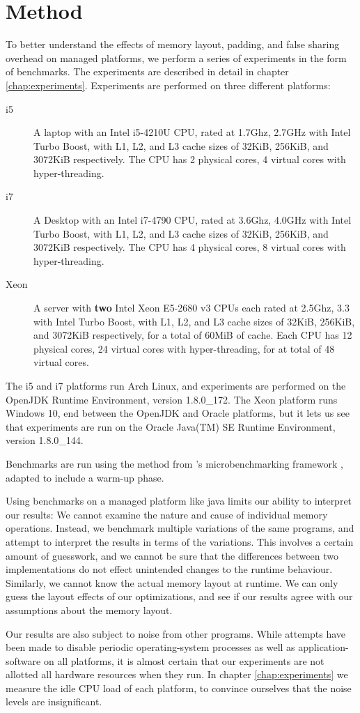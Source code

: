 \chapter{Method}
To better understand the effects of memory layout, padding, and false sharing
overhead on managed platforms, we perform a series of experiments in the form of
benchmarks. The experiments are described in detail in chapter
\ref{chap:experiments}. Experiments are performed on three different platforms:

\begin{description}
\item [i5] A laptop with an Intel i5-4210U CPU, rated at 1.7Ghz, 2.7GHz with Intel
Turbo Boost, with L1, L2, and L3 cache sizes of 32KiB, 256KiB, and 3072KiB
respectively. The CPU has 2 physical cores, 4 virtual cores with
hyper-threading.
\item [i7] A Desktop with an Intel i7-4790 CPU, rated at 3.6Ghz, 4.0GHz with Intel
Turbo Boost, with L1, L2, and L3 cache sizes of 32KiB, 256KiB, and 3072KiB
respectively. The CPU has 4 physical cores, 8 virtual cores with
hyper-threading.
\item [Xeon] A server with \textbf{two} Intel Xeon E5-2680 v3 CPUs each rated at
2.5Ghz, 3.3 with Intel Turbo Boost, with L1, L2, and L3 cache sizes of 32KiB,
256KiB, and 3072KiB respectively, for a total of 60MiB of cache. Each CPU has 12
physical cores, 24 virtual cores with hyper-threading, for at total of 48 virtual cores.
\end{description}

The i5 and i7 platforms run Arch Linux, and experiments are performed on the OpenJDK
Runtime Environment, version 1.8.0\_172. The Xeon platform runs Windows 10, end
between the OpenJDK and Oracle platforms, but it lets us see that 
experiments are run on the Oracle Java(TM) SE Runtime Environment, version
1.8.0\_144.

Benchmarks are run using the  method from \citeauthor{microbmarks}'s
microbenchmarking framework \cite{microbmarks}, adapted to include a warm-up
phase.

Using benchmarks on a managed platform like java limits our ability to interpret
our results: We cannot examine the nature and cause of individual memory
operations. Instead, we benchmark multiple variations of the same programs, and
attempt to interpret the results in terms of the variations. This involves a
certain amount of guesswork, and we cannot be sure that the differences between
two implementations do not effect unintended changes to the runtime behaviour.
Similarly, we cannot know the actual memory layout at runtime. We can only guess
the layout effects of our optimizations, and see if our results agree
with our assumptions about the memory layout.

Our results are also subject to noise from other programs. While attempts have
been made to disable periodic operating-system processes as well as
application-software on all platforms, it is almost certain that our experiments
are not allotted all hardware resources when they run. In chapter
\ref{chap:experiments} we measure the idle CPU load of each platform, to
convince ourselves that the noise levels are insignificant.

